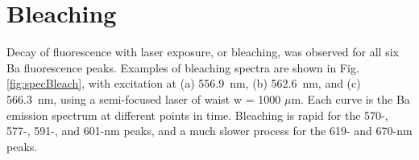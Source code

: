 


\section{Bleaching}
\label{sec:bleaching}


Decay of fluorescence with laser exposure, or bleaching, was observed for all six Ba fluorescence peaks.  Examples of bleaching spectra are shown in Fig. \ref{fig:specBleach}, with excitation at (a) 556.9~nm, (b) 562.6~nm, and (c) 566.3~nm, using a semi-focused laser of waist w = 1000 $\mu$m.  Each curve is the Ba emission spectrum at different points in time.  Bleaching is rapid for the 570-, 577-, 591-, and 601-nm peaks, and a much slower process for the 619- and 670-nm peaks.

